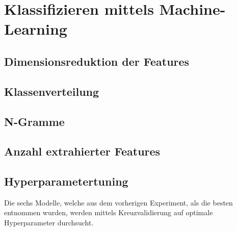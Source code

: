 \section{Klassifizieren mittels Machine-Learning}
\subsection{Dimensionsreduktion der Features}
\subsection{Klassenverteilung}
\subsection{N-Gramme}
\subsection{Anzahl extrahierter Features}
\subsection{Hyperparametertuning}
Die sechs Modelle, welche aus dem vorherigen Experiment, als die besten entnommen wurden, werden mittels Kreuzvalidierung auf optimale Hyperparameter durchsucht.

